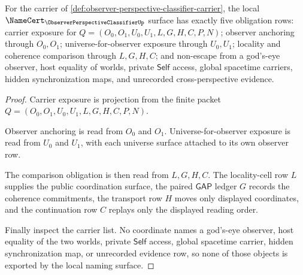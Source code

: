\begin{theorem}
\label{thm:observer-perspective-classifier-namecert-obligations}
For the carrier of \autoref{def:observer-perspective-classifier-carrier}, the local $\NameCert_{\ObserverPerspectiveClassifierUp}$ surface has exactly five obligation rows: carrier exposure for $Q=(O_0,O_1,U_0,U_1,L,G,H,C,P,N)$; observer anchoring through $O_0,O_1$; universe-for-observer exposure through $U_0,U_1$; locality and coherence comparison through $L,G,H,C$; and non-escape from a god's-eye observer, host equality of worlds, private $\mathsf{Self}$ access, global spacetime carriers, hidden synchronization maps, and unrecorded cross-perspective evidence.
\end{theorem}
\begin{proof}
Carrier exposure is projection from the finite packet $Q=(O_0,O_1,U_0,U_1,L,G,H,C,P,N)$.

Observer anchoring is read from $O_0$ and $O_1$. Universe-for-observer exposure is read from $U_0$ and $U_1$, with each universe surface attached to its own observer row.

The comparison obligation is then read from $L,G,H,C$. The locality-cell row $L$ supplies the public coordination surface, the paired $\mathsf{GAP}$ ledger $G$ records the coherence commitments, the transport row $H$ moves only displayed coordinates, and the continuation row $C$ replays only the displayed reading order.

Finally inspect the carrier list. No coordinate names a god's-eye observer, host equality of the two worlds, private $\mathsf{Self}$ access, global spacetime carrier, hidden synchronization map, or unrecorded evidence row, so none of those objects is exported by the local naming surface.
\end{proof}

